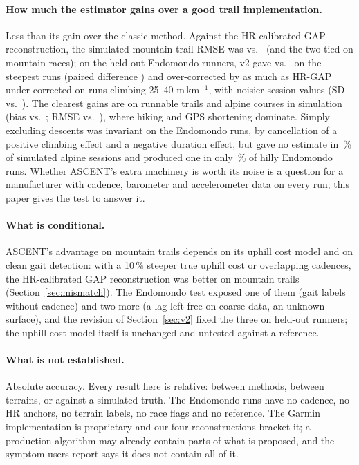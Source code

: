 \documentclass[11pt,a4paper]{article}
\newcommand{\ascent}{ASCENT}
\begin{document}
\paragraph{How much the estimator gains over a good trail implementation.} Less than its gain over the classic method. Against the HR-calibrated GAP reconstruction, the simulated mountain-trail RMSE was \nrmseASCENTmountain{} vs.\ \nrmseGtrailhrgapmountain{} (and the two tied on mountain races); on the held-out Endomondo runners, v2 gave \nvtestDTwo{} vs.\ \nvtestDGhrgap{} on the steepest runs (paired difference \nvpairD) and over-corrected by as much as HR-GAP under-corrected on runs climbing 25--40 m\,km$^{-1}$, with noisier session values (SD \nvtestSdTwo{} vs.\ \nvtestSdGhrgap). The clearest gains are on runnable trails and alpine courses in simulation (bias \nbiasASCENTtrailrunnable{} vs.\ \nbiasGtrailhrgaptrailrunnable; RMSE \nrmseASCENTskyrun{} vs.\ \nrmseGtrailhrgapskyrun), where hiking and GPS shortening dominate. Simply excluding descents was invariant on the Endomondo runs, by cancellation of a positive climbing effect and a negative duration effect, but gave no estimate in \nmissGnodescskyrun\,\% of simulated alpine sessions and produced one in only \nfrCovHillyGnodesc\,\% of hilly Endomondo runs. Whether \ascent's extra machinery is worth its noise is a question for a manufacturer with cadence, barometer and accelerometer data on every run; this paper gives the test to answer it.

\paragraph{What is conditional.} \ascent's advantage on mountain trails depends on its uphill cost model and on clean gait detection: with a 10\,\% steeper true uphill cost or overlapping cadences, the HR-calibrated GAP reconstruction was better on mountain trails (Section~\ref{sec:mismatch}). The Endomondo test exposed one of them (gait labels without cadence) and two more (a lag left free on coarse data, an unknown surface), and the revision of Section~\ref{sec:v2} fixed the three on held-out runners; the uphill cost model itself is unchanged and untested against a reference.

\paragraph{What is not established.} Absolute accuracy. Every result here is relative: between methods, between terrains, or against a simulated truth. The Endomondo runs have no cadence, no HR anchors, no terrain labels, no race flags and no reference. The Garmin implementation is proprietary and our four reconstructions bracket it; a production algorithm may already contain parts of what is proposed, and the symptom users report says it does not contain all of it.
\end{document}
